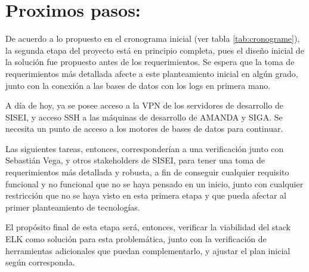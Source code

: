 \section{Proximos pasos:}

De acuerdo a lo propuesto en el cronograma inicial (ver tabla \ref{tab:cronograme}), la segunda etapa del proyecto está en principio completa, pues el diseño inicial de la solución fue propuesto antes de los requerimientos. Se espera que la toma de requerimientos más detallada afecte a este planteamiento inicial en algún grado, junto con la conexión a las bases de datos con los logs en primera mano.

A día de hoy, ya se posee acceso a la VPN de los servidores de desarrollo de SISEI, y acceso SSH a las máquinas de desarrollo de AMANDA y SIGA. Se necesita un punto de acceso a los motores de bases de datos para continuar.

Las siguientes tareas, entonces, corresponderían a una verificación junto con Sebastián Vega, y otros stakeholders de SISEI, para tener una toma de requerimientos más detallada y robusta, a fin de conseguir cualquier requisito funcional y no funcional que no se haya pensado en un inicio, junto con cualquier restricción que no se haya visto en esta primera etapa y que pueda afectar al primer planteamiento de tecnologías.

El propósito final de esta etapa será, entonces, verificar la viabilidad del stack ELK como solución para esta problemática, junto con la verificación de herramientas adicionales que puedan complementarlo, y ajustar el plan inicial según corresponda.

\clearpage
